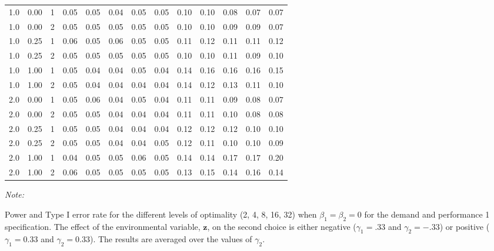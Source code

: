\begin{table}
\begin{threeparttable}
\begin{tabular}[t]{rrrrrrrrrrrrr}
\hspace{1em}1.0 & 0.00 & 1 & 0.05 & 0.05 & 0.04 & 0.05 & 0.05 & 0.10 & 0.10 & 0.08 & 0.07 & 0.07\\
\hspace{1em}1.0 & 0.00 & 2 & 0.05 & 0.05 & 0.05 & 0.05 & 0.05 & 0.10 & 0.10 & 0.09 & 0.09 & 0.07\\
\hspace{1em}1.0 & 0.25 & 1 & 0.06 & 0.05 & 0.06 & 0.05 & 0.05 & 0.11 & 0.12 & 0.11 & 0.11 & 0.12\\
\hspace{1em}1.0 & 0.25 & 2 & 0.05 & 0.05 & 0.05 & 0.05 & 0.05 & 0.10 & 0.10 & 0.11 & 0.09 & 0.10\\
\hspace{1em}1.0 & 1.00 & 1 & 0.05 & 0.04 & 0.04 & 0.05 & 0.04 & 0.14 & 0.16 & 0.16 & 0.16 & 0.15\\
\hspace{1em}1.0 & 1.00 & 2 & 0.05 & 0.04 & 0.04 & 0.04 & 0.04 & 0.14 & 0.12 & 0.13 & 0.11 & 0.10\\
\hspace{1em}2.0 & 0.00 & 1 & 0.05 & 0.06 & 0.04 & 0.05 & 0.04 & 0.11 & 0.11 & 0.09 & 0.08 & 0.07\\
\hspace{1em}2.0 & 0.00 & 2 & 0.05 & 0.05 & 0.04 & 0.04 & 0.04 & 0.11 & 0.11 & 0.10 & 0.08 & 0.08\\
\hspace{1em}2.0 & 0.25 & 1 & 0.05 & 0.05 & 0.04 & 0.04 & 0.04 & 0.12 & 0.12 & 0.12 & 0.10 & 0.10\\
\hspace{1em}2.0 & 0.25 & 2 & 0.05 & 0.05 & 0.04 & 0.04 & 0.05 & 0.12 & 0.11 & 0.10 & 0.10 & 0.09\\
\hspace{1em}2.0 & 1.00 & 1 & 0.04 & 0.05 & 0.05 & 0.06 & 0.05 & 0.14 & 0.14 & 0.17 & 0.17 & 0.20\\
\hspace{1em}2.0 & 1.00 & 2 & 0.06 & 0.05 & 0.05 & 0.05 & 0.05 & 0.13 & 0.15 & 0.14 & 0.16 & 0.14\\
\bottomrule
\end{tabular}
\begin{tablenotes}
\item \textit{Note: } 
\item Power and Type I error rate for the different levels of optimality (2, 4, 8, 16, 32) when $\beta_1 = \beta_2 = 0$ for the demand and performance 1 specification. The effect of the environmental variable, $\mathbf{z}$, on the second choice is either negative ($\gamma_1 = .33$ and $\gamma_2 = -.33$) or positive ($\gamma_1 = 0.33$ and $\gamma_2 = 0.33$). The results are averaged over the values of $\gamma_2$.
\end{tablenotes}
\end{threeparttable}
\end{table}